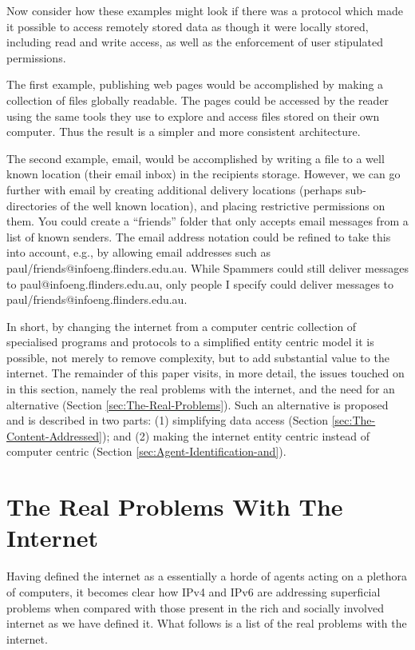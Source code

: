 \documentclass[british,english]{article}
\begin{document}
Now consider how these examples might look if there was a protocol
which made it possible to access remotely stored data as though it
were locally stored, including read and write access, as well as the
enforcement of user stipulated permissions. 

The first example, publishing web pages would be accomplished by making
a collection of files globally readable. The pages could be accessed
by the reader using the same tools they use to explore and access
files stored on their own computer. Thus the result is a simpler and
more consistent architecture. 

The second example, email, would be accomplished by writing a file
to a well known location (their email inbox) in the recipients storage.
However, we can go further with email by creating additional delivery
locations (perhaps sub-directories of the well known location), and
placing restrictive permissions on them. You could create a {}``friends''
folder that only accepts email messages from a list of known senders.
The email address notation could be refined to take this into account,
e.g., by allowing email addresses such as paul/friends@infoeng.flinders.edu.au.
While Spammers could still deliver messages to paul@infoeng.flinders.edu.au,
only people I specify could deliver messages to paul/friends@infoeng.flinders.edu.au. 

In short, by changing the internet from a computer centric collection
of specialised programs and protocols to a simplified entity centric
model it is possible, not merely to remove complexity, but to add
substantial value to the internet. The remainder of this paper visits,
in more detail, the issues touched on in this section, namely the
real problems with the internet, and the need for an alternative (Section
\ref{sec:The-Real-Problems}). Such an alternative is proposed and
is described in two parts: (1) simplifying data access (Section \ref{sec:The-Content-Addressed});
and (2) making the internet entity centric instead of computer centric
(Section \ref{sec:Agent-Identification-and}).


\section{\label{sec:The-Real-Problems}The Real Problems With The Internet}

Having defined the internet as a essentially a horde of agents acting
on a plethora of computers, it becomes clear how IPv4 and IPv6 are
addressing superficial problems when compared with those present in
the rich and socially involved internet as we have defined it. What
follows is a list of the real problems with the internet.
\end{document}
